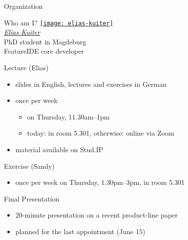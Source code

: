 \begin{frame}{Organization}
	\begin{mycolumns}[widths={28}]
		\begin{definition}{Who am I?}
			\centering
			\href{https://www.dbse.ovgu.de/Mitarbeiter/Elias+Kuiter.html}{\texttt{[image: elias-kuiter]}}\\[.5ex]
			\href{https://www.dbse.ovgu.de/Mitarbeiter/Elias+Kuiter.html}{\emph{Elias Kuiter}}\\[.5ex]
			\small PhD student in Magdeburg\\[.5ex]
			FeatureIDE core developer
		\end{definition}
	\mynextcolumn
		\begin{note}{Lecture (Elias)}
			\begin{itemize}
				\item slides in English, lectures and exercises in German
				\item once per week
				\begin{itemize}
					\item on Thursday, 11.30am--1pm
					\item today: in room 5.301, otherwise: online via Zoom
				\end{itemize}
				\item material available on Stud.IP
			\end{itemize}
		\end{note}
		\begin{note}{Exercise (Sandy)}
			\begin{itemize}
				\item once per week on Thursday, 1.30pm--3pm, in room 5.301
			\end{itemize}
		\end{note}
		\begin{note}{Final Presentation }
			\begin{itemize}
				\item 20-minute presentation on a recent product-line paper
				\item planned for the last appointment (June 15)
			\end{itemize}
		\end{note}
	\end{mycolumns}
\end{frame}


